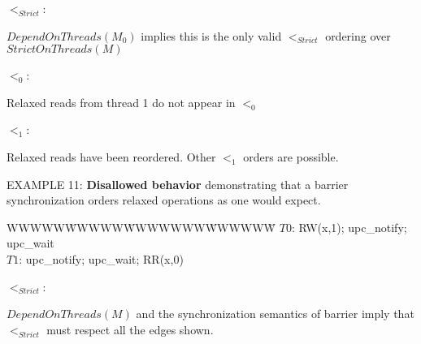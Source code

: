 \documentclass[12pt,titlepage]{article}
\newcounter{parnum}
\newcommand\np{\addtocounter{parnum}{1}\hspace{-2em}\makebox[2em][l]{\arabic{parnum}}}
\begin{document}
\bigskip
$<_{Strict}$:\hspace{0.25in}
\hspace{0.4in}
\parbox[t]{2.5in}
{$DependOnThreads(M_0)$ implies this is the only valid $<_{Strict}$ ordering
over $StrictOnThreads(M)$}

\bigskip
$<_0$:\hspace{0.25in}
\hspace{0.6in}
\parbox[t]{2.5in}
{Relaxed reads from thread 1 do not appear in $<_0$}

\bigskip
$<_1$:\hspace{0.25in}
\hspace{0.25in}
\parbox[t]{2in}
{Relaxed reads have been reordered. Other $<_1$ orders are possible.}

\bigskip
\np EXAMPLE 11: \textbf{Disallowed behavior} 
demonstrating that a barrier synchronization 
orders relaxed operations as one would expect.

\begin{tabbing}WWWWW\=WWWWW\=WWWWWWW\=WWWWWW\=\kill
$T0$: \> RW(x,1); \> upc\_notify; \> upc\_wait\\
$T1$: \> \> upc\_notify; \> upc\_wait; \> RR(x,0)\\
\end{tabbing}

\bigskip
$<_{Strict}$:\\
\hspace{0.1in}
\parbox[t]{2.3in}
{$DependOnThreads(M)$ and the synchronization semantics of barrier imply
that $<_{Strict}$ must respect all the edges shown.\footnotemark}
\end{document}
